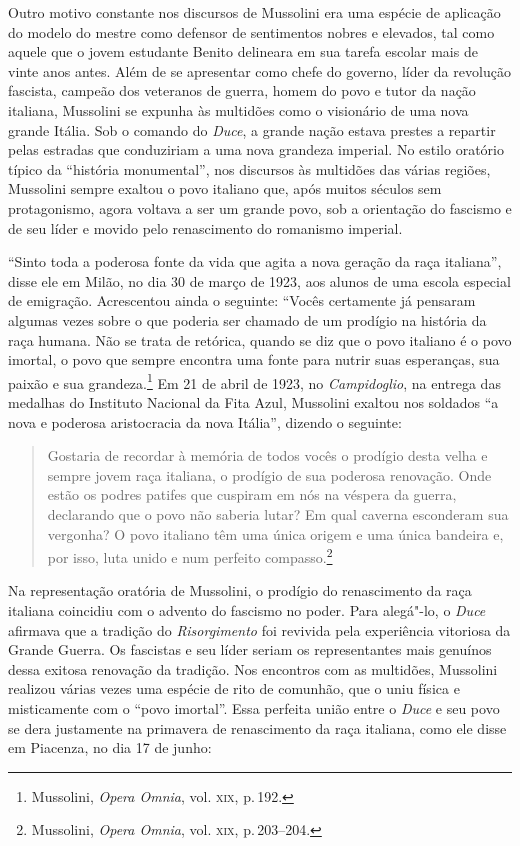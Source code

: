 Outro motivo constante nos discursos de Mussolini era uma espécie de
aplicação do modelo do mestre como defensor de sentimentos nobres e
elevados, tal como aquele que o jovem estudante Benito delineara em sua
tarefa escolar mais de vinte anos antes. Além de se apresentar como
chefe do governo, líder da revolução fascista, campeão dos veteranos de
guerra, homem do povo e tutor da nação italiana, Mussolini se expunha às
multidões como o visionário de uma nova grande Itália. Sob o comando do
\emph{Duce}, a grande nação estava prestes a repartir pelas estradas que
conduziriam a uma nova grandeza imperial. No estilo oratório típico da
``história monumental'', nos discursos às multidões das várias regiões,
Mussolini sempre exaltou o povo italiano que, após muitos séculos sem
protagonismo, agora voltava a ser um grande povo, sob a orientação do
fascismo e de seu líder e movido pelo renascimento do romanismo
imperial.

``Sinto toda a poderosa fonte da vida que agita a nova geração da raça
italiana'', disse ele em Milão, no dia 30 de março de 1923, aos alunos
de uma escola especial de emigração. Acrescentou ainda o seguinte:
``Vocês certamente já pensaram algumas vezes sobre o que poderia ser
chamado de um prodígio na história da raça humana. Não se trata de
retórica, quando se diz que o povo italiano é o povo imortal, o povo que
sempre encontra uma fonte para nutrir suas esperanças, sua paixão e sua
grandeza.\footnote{Mussolini, \emph{Opera Omnia}, vol. \textsc{xix}, p.\,192.} Em
21 de abril de 1923, no \emph{Campidoglio}, na entrega das medalhas do
Instituto Nacional da Fita Azul, Mussolini exaltou nos soldados ``a nova
e poderosa aristocracia da nova Itália'', dizendo o seguinte:

\begin{quote}
Gostaria de recordar à memória de todos vocês o prodígio desta velha e
sempre jovem raça italiana, o prodígio de sua poderosa renovação. Onde
estão os podres patifes que cuspiram em nós na véspera da guerra,
declarando que o povo não saberia lutar? Em qual caverna esconderam sua
vergonha? O povo italiano têm uma única origem e uma única bandeira e,
por isso, luta unido e num perfeito compasso.\footnote{Mussolini,
  \emph{Opera Omnia}, vol. \textsc{xix}, p.\,203--204.}
\end{quote}

Na representação oratória de Mussolini, o prodígio do renascimento da
raça italiana coincidiu com o advento do fascismo no poder. Para
alegá"-lo, o \emph{Duce} afirmava que a tradição do \emph{Risorgimento}
foi revivida pela experiência vitoriosa da Grande Guerra. Os fascistas e
seu líder seriam os representantes mais genuínos dessa exitosa renovação
da tradição. Nos encontros com as multidões, Mussolini realizou várias
vezes uma espécie de rito de comunhão, que o uniu física e misticamente
com o ``povo imortal''. Essa perfeita união entre o \emph{Duce} e seu
povo se dera justamente na primavera de renascimento da raça italiana,
como ele disse em Piacenza, no dia 17 de junho:

